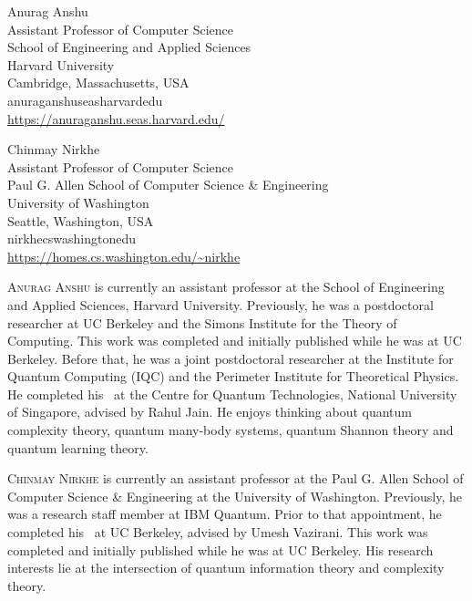 \documentclass{toc}
\begin{document}
%
%
%
%
%
\begin{tocauthors}
\begin{tocinfo}[Anshu]
 Anurag Anshu\\
 Assistant Professor of Computer Science \\
 School of Engineering and Applied Sciences \\
 Harvard University \\
 Cambridge, Massachusetts, USA \\
 anuraganshu\tocat{}seas\tocdot{}harvard\tocdot{}edu \\   %
 \url{https://anuraganshu.seas.harvard.edu/}      %
\end{tocinfo}
%
\begin{tocinfo}[Nirkhe]
  Chinmay Nirkhe\\
  Assistant Professor of Computer Science\\
 Paul G. Allen School of Computer Science \& Engineering \\
 University of Washington\\
  Seattle, Washington, USA\\
  nirkhe\tocat{}cs\tocdot{}washington\tocdot{}edu \\
  \url{https://homes.cs.washington.edu/~nirkhe}
\end{tocinfo}
\end{tocauthors}

%
%
%
%
%
%
%
%
%
%
%
%
%
%
%
%
%
%
%
%
\begin{tocaboutauthors}
\begin{tocabout}[Anshu]  %
  \textsc{Anurag Anshu} is currently an assistant professor at the School of Engineering and Applied Sciences, Harvard University. Previously, he was a postdoctoral researcher at UC Berkeley and the Simons Institute for the Theory of Computing. This work was completed and initially published while he was at UC Berkeley. Before that, he was a joint postdoctoral researcher at the Institute for Quantum Computing (IQC) and the Perimeter Institute for Theoretical Physics. He completed his \phd\ at
the  %
Centre for Quantum Technologies, National University of Singapore, advised by Rahul Jain. He enjoys thinking about quantum complexity theory, quantum many-body systems, quantum Shannon theory and quantum learning theory.
\end{tocabout}
\begin{tocabout}[Nirkhe]
  \textsc{Chinmay Nirkhe} is
  currently an assistant professor at the Paul G. Allen School of Computer Science \& Engineering at the University of Washington. Previously, he was a research staff member at IBM Quantum.
%
Prior to that appointment,  %
he completed his \phd\ at UC Berkeley, advised by Umesh Vazirani. This work was completed and initially published while he was at UC Berkeley. His research interests lie at the intersection of quantum information  
theory  %
and complexity theory.
\end{tocabout}
\end{tocaboutauthors}
\end{document}
